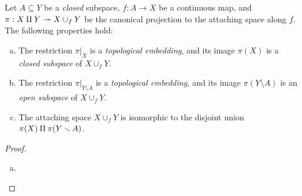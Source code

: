 \begin{proposition}
\label{prop:attaching-space-properties}
Let \(A \subseteq Y\) be a \emph{closed} subspace, \(f: A \to X\) be a
continuous map, and \(\pi: X \amalg Y \twoheadrightarrow X \cup_f Y\) be the canonical
projection to the attaching space along \(f\). The following properties hold:
\begin{enumerate}[(a)]\setlength\itemsep{0em}
\item The restriction \(\pi|_X\) is a \emph{topological embedding}, and its
  image \(\pi(X)\) is a \emph{closed subspace} of \(X \cup_f Y\).

\item The restriction \(\pi|_{Y \setminus A}\) is a \emph{topological
    embedding}, and its image \(\pi(Y \setminus A)\) is an \emph{open subspace}
  of \(X \cup_f Y\).

\item The attaching space \(X \cup_f Y\) is isomorphic to the disjoint union
  \(\pi(X) \amalg \pi(Y \smallsetminus A)\).
\end{enumerate}
\end{proposition}

\begin{proof}
\begin{enumerate}[(a)]\setlength\itemsep{0em}
\item
\end{enumerate}
\end{proof}

